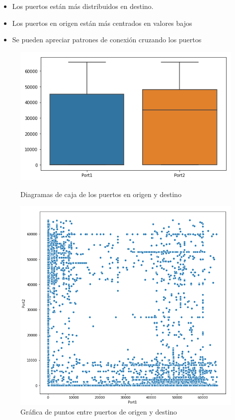 \begin{itemize}
    \item Los puertos están más distribuidos en destino.
    \item Los puertos en origen están más centrados en valores bajos
    \item Se pueden apreciar patrones de conexión cruzando los puertos
\end{itemize}

\begin{figure}[H]
   \begin{minipage}[b]{0.48\textwidth}
     \centering
     \includegraphics[width=0.8\linewidth]{figs/dist_ports.PNG}
     \caption{Diagramas de caja de los puertos en origen y destino}
     \label{Fig:dist_port}
   \end{minipage}\hfill
   \begin{minipage}[b]{0.48\textwidth}
     \centering
     \includegraphics[width=0.8\linewidth]{figs/port1vs2.PNG}
     \caption{Gráfica de puntos entre puertos de origen y destino}
     \label{Fig:scatterport}
   \end{minipage}
\end{figure}


